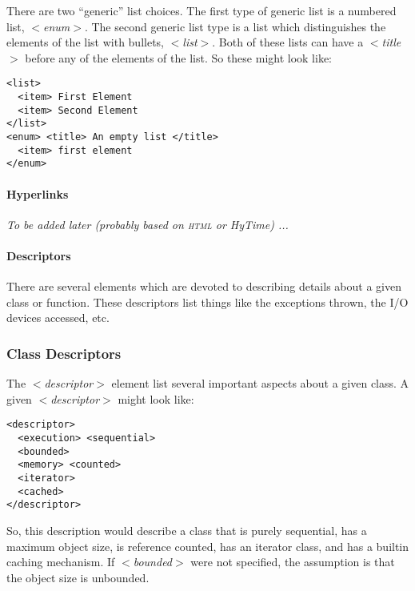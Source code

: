 There are two ``generic'' list choices. The first type of generic list
is a numbered list, \textit{$<$enum$>$}. The second generic list type is a
list which distinguishes the elements of the list with bullets, \textit{$<$list$>$}.
Both of these lists can have a \textit{$<$title$>$} before any of the elements of the
list. So these might look like:
\begin{verbatim}
<list>
  <item> First Element
  <item> Second Element
</list>
<enum> <title> An empty list </title>
  <item> first element
</enum>
\end{verbatim}
\noindent

\paragraph{Hyperlinks}

\emph{To be added later (probably based on \textsc{html} or HyTime) ...}

\paragraph{Descriptors}

There are several elements which are devoted to describing details about
a given class or function. These descriptors list things like the 
exceptions thrown, the I/O devices accessed, etc.

\subsubsection*{Class Descriptors}

The \textit{$<$descriptor$>$} element list several important aspects about a given
class. A given \textit{$<$descriptor$>$} might look like:
\begin{verbatim}
<descriptor>
  <execution> <sequential>
  <bounded>
  <memory> <counted>
  <iterator>
  <cached>
</descriptor>
\end{verbatim}
\noindent
So, this description would describe a class that is purely sequential, has 
a maximum object size, is reference counted, has an iterator class, and
has a builtin caching mechanism. If \textit{$<$bounded$>$} were not specified,
the assumption is that the object size is unbounded.

